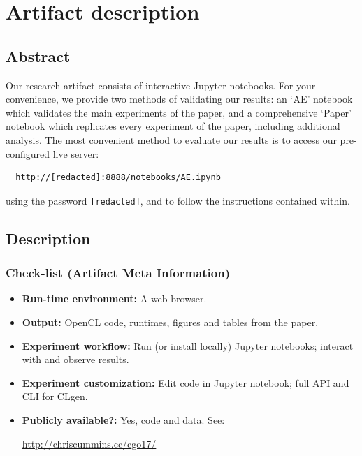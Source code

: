 \appendix

\section{Artifact description}

\subsection{Abstract}

Our research artifact consists of interactive Jupyter notebooks. For your convenience, we provide two methods of validating our results: an `AE' notebook which validates the main experiments of the paper, and a comprehensive `Paper' notebook which replicates every experiment of the paper, including additional analysis. The most convenient method to evaluate our results is to access our pre-configured live server:
\begin{verbatim}
  http://[redacted]:8888/notebooks/AE.ipynb
\end{verbatim}
using the password \texttt{[redacted]}, and to follow the instructions contained within.

\subsection{Description}

\subsubsection{Check-list (Artifact Meta Information)}

{\small
\begin{itemize}
  \item {\bf Run-time environment: }A web browser.%
  \item {\bf Output: }OpenCL code, runtimes, figures and tables from the paper.
  \item {\bf Experiment workflow: }Run (or install locally) Jupyter notebooks; interact with and observe results.
  \item {\bf Experiment customization: }Edit code in Jupyter notebook; full API and CLI for CLgen.
  \item {\bf Publicly available?: }Yes, code and data. See:

  \url{http://chriscummins.cc/cgo17/}
\end{itemize}
}

